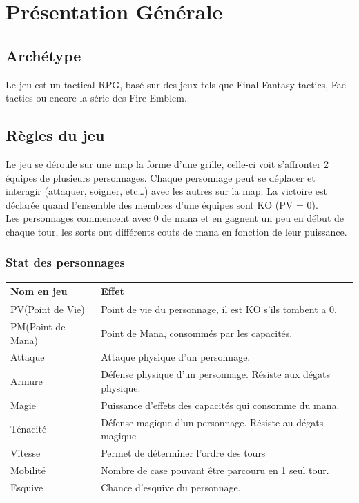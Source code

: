 \documentclass[a4paper,12pt]{article}
\begin{document}
\clearpage
\section{Présentation Générale}

\subsection{Archétype}

Le jeu est un tactical RPG, basé sur des jeux tels que Final Fantasy
tactics, Fae tactics ou encore la série des Fire Emblem.

\subsection{Règles du jeu}

Le jeu se déroule sur une map la forme d'une grille, celle-ci voit 
s'affronter 2 équipes de plusieurs personnages. Chaque personnage peut se 
déplacer et interagir (attaquer, soigner, etc\dots) avec les autres sur la map.
La victoire est déclarée quand l'ensemble des membres d'une équipes 
sont KO (PV = 0). \\
Les personnages commencent avec 0 de mana et en gagnent un peu en début de chaque tour, les sorts ont différents couts de mana en fonction de leur puissance.

\subsubsection{Stat des personnages}

\begin{tabular}{|l|l|}
  \hline
  Nom en jeu & Effet \\
  \hline
  \hline
  PV(Point de Vie) & Point de vie du personnage, il est KO s'ils tombent a 0.\\
  \hline
  PM(Point de Mana) & Point de Mana, consommés par les capacités. \\
  \hline
  Attaque & Attaque physique d'un personnage. \\
  \hline
  Armure & Défense physique d'un personnage. Résiste aux dégats physique.\\
  \hline 
  Magie & Puissance d'effets des capacités qui consomme du mana. \\
  \hline 
  Ténacité & Défense magique d'un personnage. Résiste au dégats magique \\
  \hline 
  Vitesse & Permet de déterminer l'ordre des tours \\
  \hline
  Mobilité & Nombre de case pouvant être parcouru en 1 seul tour. \\
  \hline
  Esquive & Chance d'esquive du personnage. \\
  \hline
\end{tabular}
\end{document}
